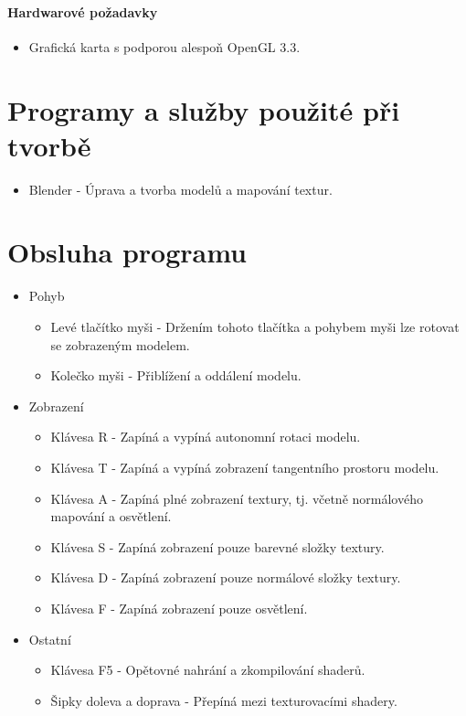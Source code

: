 \documentclass[12pt,a4paper,titlepage,final]{report}
\begin{document}
\paragraph{Hardwarové požadavky}
\begin{itemize}
	\item Grafická karta s podporou alespoň OpenGL 3.3.
\end{itemize}

\section{Programy a služby použité při tvorbě}
\begin{itemize}
	\item Blender - Úprava a tvorba modelů a mapování textur.
\end{itemize}

\section{Obsluha programu}
\begin{itemize}
	\item Pohyb
		\begin{itemize}
			\item Levé tlačítko myši - Držením tohoto tlačítka a pohybem myši lze rotovat se zobrazeným modelem.
			\item Kolečko myši - Přiblížení a oddálení modelu.
		\end{itemize}
	\item Zobrazení
		\begin{itemize}

			\item Klávesa R - Zapíná a vypíná autonomní rotaci modelu.
			\item Klávesa T - Zapíná a vypíná zobrazení tangentního prostoru modelu.
			\item Klávesa A - Zapíná plné zobrazení textury, tj. včetně normálového mapování a osvětlení.
			\item Klávesa S - Zapíná zobrazení pouze barevné složky textury.		\item Klávesa D - Zapíná zobrazení pouze normálové složky textury.
			\item Klávesa F - Zapíná zobrazení pouze osvětlení.
		\end{itemize}
	\item Ostatní
		\begin{itemize}
			\item Klávesa F5 - Opětovné nahrání a zkompilování shaderů.
			\item Šipky doleva a doprava - Přepíná mezi texturovacími shadery.
		\end{itemize}
\end{itemize}
\end{document}

